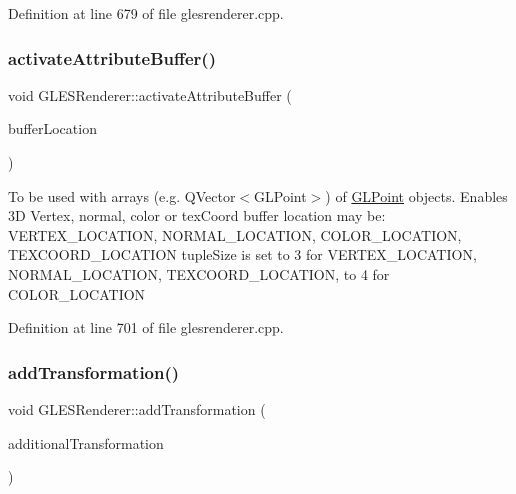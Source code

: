 Definition at line 679 of file glesrenderer.\+cpp.

\mbox{\label{class_g_l_e_s_renderer_ad0bc53b13af77050b43f7a6ba5f97ea1}} 
\subsubsection{\texorpdfstring{activateAttributeBuffer()}{activateAttributeBuffer()}}
{\footnotesize\ttfamily void G\+L\+E\+S\+Renderer\+::activate\+Attribute\+Buffer (\begin{DoxyParamCaption}\item[{\mbox{\hyperlink{class_g_l_e_s_renderer_a05f4cf233d5cf60f4d6ea50ddc06a2c4}{G\+L\+E\+S\+Renderer\+::\+Attribute\+Location}}}]{buffer\+Location }\end{DoxyParamCaption})}

To be used with arrays (e.\+g. Q\+Vector$<$\+G\+L\+Point$>$) of \mbox{\hyperlink{class_g_l_point}{G\+L\+Point}} objects. Enables 3D Vertex, normal, color or tex\+Coord buffer location may be\+: V\+E\+R\+T\+E\+X\+\_\+\+L\+O\+C\+A\+T\+I\+ON, N\+O\+R\+M\+A\+L\+\_\+\+L\+O\+C\+A\+T\+I\+ON, C\+O\+L\+O\+R\+\_\+\+L\+O\+C\+A\+T\+I\+ON, T\+E\+X\+C\+O\+O\+R\+D\+\_\+\+L\+O\+C\+A\+T\+I\+ON tuple\+Size is set to 3 for V\+E\+R\+T\+E\+X\+\_\+\+L\+O\+C\+A\+T\+I\+ON, N\+O\+R\+M\+A\+L\+\_\+\+L\+O\+C\+A\+T\+I\+ON, T\+E\+X\+C\+O\+O\+R\+D\+\_\+\+L\+O\+C\+A\+T\+I\+ON, to 4 for C\+O\+L\+O\+R\+\_\+\+L\+O\+C\+A\+T\+I\+ON 

Definition at line 701 of file glesrenderer.\+cpp.

\mbox{\label{class_g_l_e_s_renderer_a5a523cfef1b63258e863af159c04c235}} 
\subsubsection{\texorpdfstring{addTransformation()}{addTransformation()}}
{\footnotesize\ttfamily void G\+L\+E\+S\+Renderer\+::add\+Transformation (\begin{DoxyParamCaption}\item[{const Q\+Matrix4x4}]{additional\+Transformation }\end{DoxyParamCaption})}



